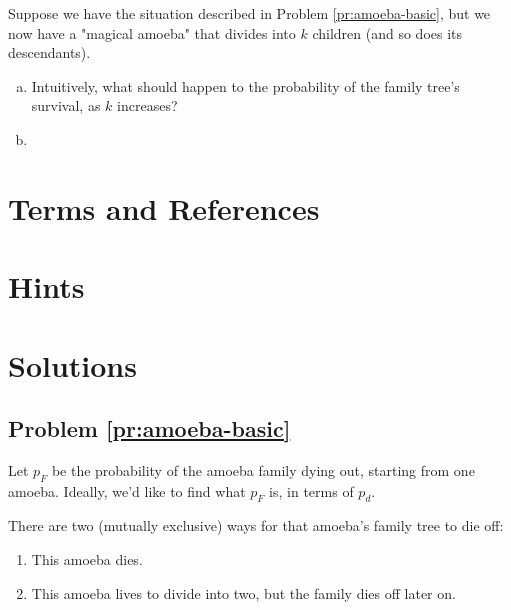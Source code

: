 \begin{problem}
\label{pr:amoeba-caprep}
\end{problem}

\begin{problem}
\label{pr:amoeba-nstart}
\end{problem}

\begin{problem}
\label{pr:amoeba-kdesc}
Suppose we have the situation described in Problem \ref{pr:amoeba-basic}, but we now have a "magical amoeba" that divides into $k$ children (and so does its descendants). 

\begin{enumerate}[(a)]
\item Intuitively, what should happen to the probability of the family tree's survival, as $k$ increases?
\item 
\end{enumerate}
\end{problem}

\newpage
\section{Terms and References}

\section{Hints}

\newpage
\section{Solutions}

\subsection{Problem \ref{pr:amoeba-basic}}

Let $p_F$ be the probability of the amoeba family dying out, starting from one amoeba. Ideally, we'd like to find what $p_F$ is, in terms of $p_d$. 

There are two (mutually exclusive) ways for that amoeba's family tree to die off: 
\begin{enumerate}
\item This amoeba dies.
\item This amoeba lives to divide into two, but the family dies off later on.
\end{enumerate} \hfill

